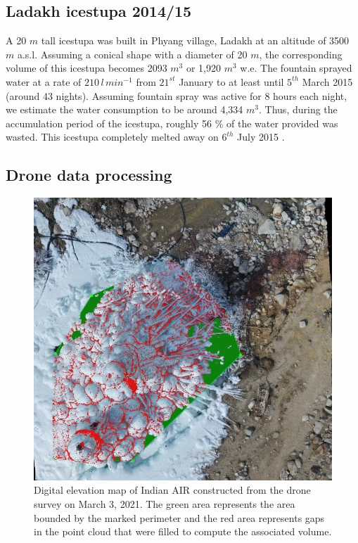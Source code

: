 \documentclass[utf8]{frontiersSCNS}
\begin{document}
\subsection{Ladakh icestupa 2014/15} \label{sec:ladakhloss}

A 20 $m$ tall icestupa \citep{iceheight} was built in Phyang village, Ladakh at an altitude of 3500 $m$ a.s.l.
Assuming a conical shape with a diameter of 20 $m$, the corresponding volume of this icestupa becomes 2093 $m^3$ or
1,920 $m^3$ w.e. The fountain sprayed water at a rate of $210\, l\,min^{-1}$ \citep{waterinput} from $21^{st}$
January \citep{waterstart} to at least until $5^{th}$ March 2015 \citep{waterend} (around 43 nights). Assuming
fountain spray was active for 8 hours each night, we estimate the water consumption to be around 4,334 $m^3$. Thus,
during the accumulation period of the icestupa, roughly 56 \% of the water provided was wasted.  This icestupa
completely melted away on $6^{th}$ July 2015 \citep{iceends}.

\subsection{Drone data processing} \label{sec:uav}

\begin{figure}
	\begin{center}
		\includegraphics[width=10 cm]{Figures/Figure_8.jpg}
	\end{center}
	\caption{Digital elevation map of Indian AIR constructed from the drone survey on March 3, 2021. The green
		area represents the area bounded by the marked perimeter and the red area represents gaps in the point cloud
    that were filled to compute the associated volume.
	}
	\label{fig:DEM}
\end{figure}
\end{document}
